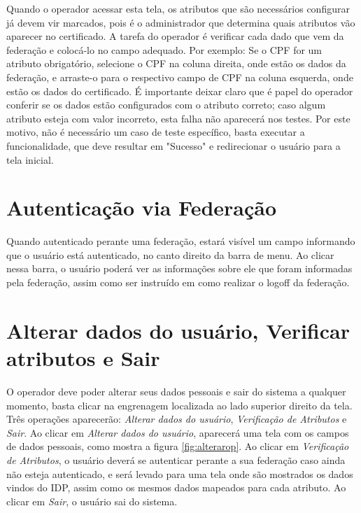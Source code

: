 Quando o operador acessar esta tela, os atributos que são necessários configurar já devem vir marcados, pois é o administrador que determina quais atributos vão aparecer no certificado. A tarefa do operador é verificar cada dado que vem da federação e colocá-lo no campo adequado. Por exemplo: Se o CPF for um atributo obrigatório, selecione o CPF na coluna direita, onde estão os dados da federação, e arraste-o para o respectivo campo de CPF na coluna esquerda, onde estão os dados do certificado. É importante deixar claro que é papel do operador conferir se os dados estão configurados com o atributo correto; caso algum atributo esteja com valor incorreto, esta falha não aparecerá nos testes. Por este motivo, não é necessário um caso de teste específico, basta executar a funcionalidade, que deve resultar em "Sucesso" e redirecionar o usuário para a tela inicial.

\section{Autenticação via Federação}

Quando autenticado perante uma federação, estará visível um campo informando que o usuário está autenticado, no canto direito da barra de menu. Ao clicar nessa barra, o usuário poderá ver as informações sobre ele que foram informadas pela federação, assim como ser instruído em como realizar o logoff da federação.

\section{Alterar dados do usuário, Verificar atributos e Sair}

O operador deve poder alterar seus dados pessoais e sair do sistema a qualquer momento, basta clicar na engrenagem localizada ao lado superior direito da tela. Três operações aparecerão: \textit{Alterar dados do usuário}, \textit{Verificação de Atributos} e \textit{Sair}. Ao clicar em \textit{Alterar dados do usuário}, aparecerá uma tela com os campos de dados pessoais, como mostra a figura \ref{fig:alterarop}. Ao clicar em \textit{Verificação de Atributos}, o usuário deverá se autenticar perante a sua federação caso ainda não esteja autenticado, e será levado para uma tela onde são mostrados os dados vindos do IDP, assim como os mesmos dados mapeados para cada atributo. Ao clicar em \textit{Sair}, o usuário sai do sistema.

